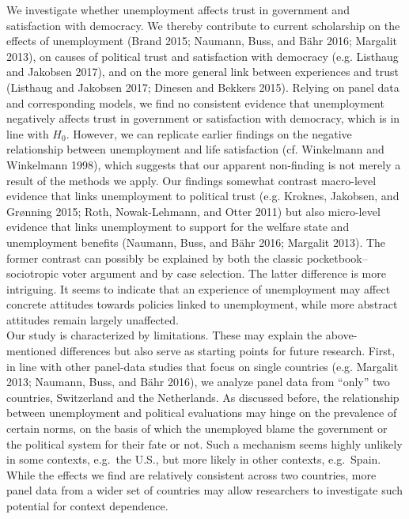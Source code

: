 \documentclass[12pt,]{article}
\begin{document}
We investigate whether unemployment affects trust in government and satisfaction with democracy. We thereby contribute to current scholarship on the effects of unemployment (Brand 2015; Naumann, Buss, and Bähr 2016; Margalit 2013), on causes of political trust and satisfaction with democracy (e.g. Listhaug and Jakobsen 2017), and on the more general link between experiences and trust (Listhaug and Jakobsen 2017; Dinesen and Bekkers 2015). Relying on panel data and corresponding models, we find no consistent evidence that unemployment negatively affects trust in government or satisfaction with democracy, which is in line with \(H_{0}\). However, we can replicate earlier findings on the negative relationship between unemployment and life satisfaction (cf. Winkelmann and Winkelmann 1998), which suggests that our apparent non-finding is not merely a result of the methods we apply. Our findings somewhat contrast macro-level evidence that links unemployment to political trust (e.g. Kroknes, Jakobsen, and Grønning 2015; Roth, Nowak-Lehmann, and Otter 2011) but also micro-level evidence that links unemployment to support for the welfare state and unemployment benefits (Naumann, Buss, and Bähr 2016; Margalit 2013). The former contrast can possibly be explained by both the classic pocketbook--sociotropic voter argument and by case selection. The latter difference is more intriguing. It seems to indicate that an experience of unemployment may affect concrete attitudes towards policies linked to unemployment, while more abstract attitudes remain largely unaffected.\\
Our study is characterized by limitations. These may explain the above-mentioned differences but also serve as starting points for future research. First, in line with other panel-data studies that focus on single countries (e.g. Margalit 2013; Naumann, Buss, and Bähr 2016), we analyze panel data from ``only'' two countries, Switzerland and the Netherlands. As discussed before, the relationship between unemployment and political evaluations may hinge on the prevalence of certain norms, on the basis of which the unemployed blame the government or the political system for their fate or not. Such a mechanism seems highly unlikely in some contexts, e.g.~the U.S., but more likely in other contexts, e.g.~Spain. While the effects we find are relatively consistent across two countries, more panel data from a wider set of countries may allow researchers to investigate such potential for context dependence.\\
\end{document}
